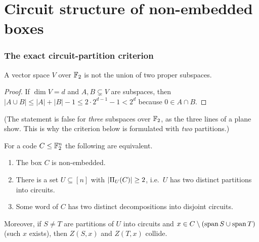 \part{Circuit structure of non-embedded boxes}

\section{The exact circuit-partition criterion}\label{sec:E1}

\begin{lemma}\label{lem:notunion}
A vector space $V$ over $\mathbb F_2$ is not the union of two proper subspaces.
\end{lemma}

\begin{proof}
If $\dim V=d$ and $A,B\subsetneq V$ are subspaces, then $|A\cup B|\le|A|+|B|-1\le2\cdot2^{d-1}-1<2^d$ because $0\in A\cap B$.
\end{proof}

(The statement is false for \emph{three} subspaces over $\mathbb F_2$, as the three lines of a plane show. This is why the criterion below is formulated with \emph{two} partitions.)

\begin{theorem}\label{thm:E1}
For a code $C\le\mathbb F_2^n$ the following are equivalent.
\begin{enumerate}[label=(\roman*)]
\item The box $C$ is non-embedded.
\item There is a set $U\subseteq[n]$ with $|\Pi_U(C)|\ge2$, i.e.\ $U$ has two distinct partitions into circuits.
\item Some word of $C$ has two distinct decompositions into disjoint circuits.
\end{enumerate}
Moreover, if $S\ne T$ are partitions of $U$ into circuits and $x\in C\setminus(\operatorname{span} S\cup\operatorname{span} T)$ (such $x$ exists), then $Z(S,x)$ and $Z(T,x)$ collide.
\end{theorem}

